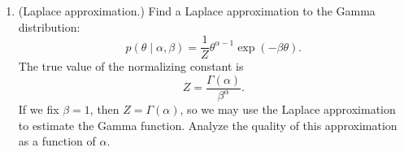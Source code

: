 \documentclass{article}
\newcommand{\given}{\mid}
\begin{document}
\begin{enumerate}
\item
  (Laplace approximation.)
  Find a Laplace approximation to the Gamma distribution:
  \begin{equation*}
    p(\theta \given \alpha, \beta)
    =
    \frac{1}{Z}
    \theta^{\alpha - 1}
    \exp(-\beta\theta).
  \end{equation*}
  The true value of the normalizing constant is
  \begin{equation*}
    Z = \frac{\Gamma(\alpha)}{\beta^\alpha}.
  \end{equation*}
  If we fix $\beta = 1$, then $Z = \Gamma(\alpha)$, so we may use the
  Laplace approximation to estimate the Gamma function.  Analyze the
  quality of this approximation as a function of $\alpha$.

\end{enumerate}
\end{document}

